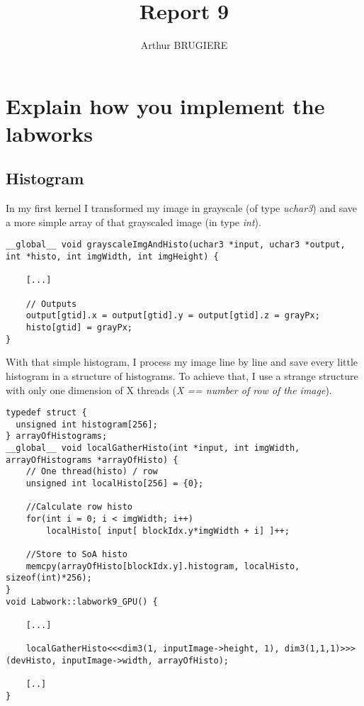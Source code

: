 \documentclass[11pt]{article} %
\title{Report 9}
\author{Arthur BRUGIERE}
\begin{document}
\maketitle

\section{Explain how you implement the labworks}

\subsection{Histogram}

In my first kernel I transformed my image in grayscale (of type {\it uchar3}) and save a more simple array of that grayscaled image (in type {\it int}).

\begin{lstlisting}[style=CStyle]
__global__ void grayscaleImgAndHisto(uchar3 *input, uchar3 *output, int *histo, int imgWidth, int imgHeight) {
    
    [...]

    // Outputs
    output[gtid].x = output[gtid].y = output[gtid].z = grayPx;
    histo[gtid] = grayPx;
}
\end{lstlisting}

With that simple histogram, I process my image line by line and save every little histogram in a structure of histograms. To achieve that, I use a strange structure with only one dimension of X threads ({\it X == number of row of the image}).

\begin{lstlisting}[style=CStyle]
typedef struct {
  unsigned int histogram[256];
} arrayOfHistograms;
__global__ void localGatherHisto(int *input, int imgWidth, arrayOfHistograms *arrayOfHisto) {
    // One thread(histo) / row
    unsigned int localHisto[256] = {0};
    
    //Calculate row histo
    for(int i = 0; i < imgWidth; i++)
        localHisto[ input[ blockIdx.y*imgWidth + i] ]++;
    
    //Store to SoA histo
    memcpy(arrayOfHisto[blockIdx.y].histogram, localHisto, sizeof(int)*256);    
}
void Labwork::labwork9_GPU() {

	[...]

    localGatherHisto<<<dim3(1, inputImage->height, 1), dim3(1,1,1)>>>(devHisto, inputImage->width, arrayOfHisto);

    [..]
}
\end{lstlisting}
\end{document}
